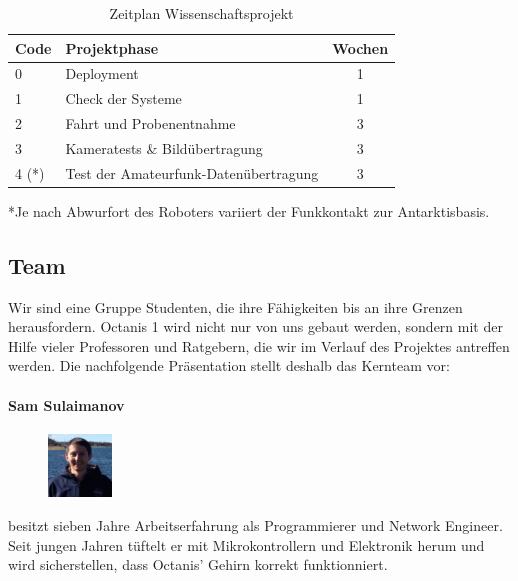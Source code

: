 \documentclass[a4paper,12pt]{article}
\begin{document}
\begin{table}[h!]
\centering
\begin{tabular}{ l | l | c }
\bfseries{Code} & \bfseries{Projektphase} & \bfseries{Wochen} \\
\hline

0 & Deployment & 1 \\
1 & Check der Systeme & 1 \\
2 & Fahrt und Probenentnahme & 3 \\
3 & Kameratests \& Bildübertragung & 3 \\
4 (*)& Test der Amateurfunk-Datenübertragung  & 3 \\

\end{tabular}
\caption{Zeitplan Wissenschaftsprojekt}

*Je nach Abwurfort des Roboters variiert der Funkkontakt zur Antarktisbasis. 

\end{table}

\pagebreak

\subsection{Team}

Wir sind eine Gruppe Studenten, die ihre Fähigkeiten bis an ihre Grenzen herausfordern. Octanis 1 wird nicht nur von uns gebaut werden, sondern mit der Hilfe vieler Professoren und Ratgebern, die wir im Verlauf des Projektes antreffen werden. Die nachfolgende Präsentation stellt deshalb das Kernteam vor:




\paragraph{Sam Sulaimanov} 
\begin{figure}
    \centering
    \vspace{-13pt}
    \includegraphics[width=0.15\textwidth]{sam}
\end{figure} besitzt sieben Jahre Arbeitserfahrung als Programmierer und Network Engineer. Seit jungen Jahren tüftelt er mit Mikrokontrollern und Elektronik herum und wird sicherstellen, dass Octanis' Gehirn korrekt funktionniert.
\\ \\
\end{document}
